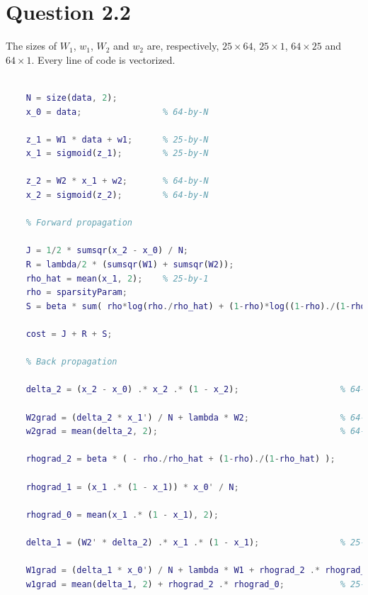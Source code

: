 \documentclass{article}
\begin{document}
\section*{Question 2.2}
{
    The sizes of $W_1$, $w_1$, $W_2$ and $w_2$ are, respectively, $25\times 64$, $25\times 1$, $64\times 25$ and $64\times 1$. Every line of code is vectorized.

    \begin{lstlisting}[language=MATLAB]

    N = size(data, 2);
    x_0 = data;                % 64-by-N
    
    z_1 = W1 * data + w1;      % 25-by-N
    x_1 = sigmoid(z_1);        % 25-by-N
    
    z_2 = W2 * x_1 + w2;       % 64-by-N
    x_2 = sigmoid(z_2);        % 64-by-N
    
    % Forward propagation
    
    J = 1/2 * sumsqr(x_2 - x_0) / N;
    R = lambda/2 * (sumsqr(W1) + sumsqr(W2));
    rho_hat = mean(x_1, 2);    % 25-by-1
    rho = sparsityParam;
    S = beta * sum( rho*log(rho./rho_hat) + (1-rho)*log((1-rho)./(1-rho_hat)) );
    
    cost = J + R + S;
    
    % Back propagation
    
    delta_2 = (x_2 - x_0) .* x_2 .* (1 - x_2);                    % 64-by-N
    
    W2grad = (delta_2 * x_1') / N + lambda * W2;                  % 64-by-25
    w2grad = mean(delta_2, 2);                                    % 64-by-1
    
    rhograd_2 = beta * ( - rho./rho_hat + (1-rho)./(1-rho_hat) );
    
    rhograd_1 = (x_1 .* (1 - x_1)) * x_0' / N;
    
    rhograd_0 = mean(x_1 .* (1 - x_1), 2);
    
    delta_1 = (W2' * delta_2) .* x_1 .* (1 - x_1);                % 25-by-N
    
    W1grad = (delta_1 * x_0') / N + lambda * W1 + rhograd_2 .* rhograd_1; % 25-by-64
    w1grad = mean(delta_1, 2) + rhograd_2 .* rhograd_0;           % 25-by-1

    \end{lstlisting}
}
\end{document}

